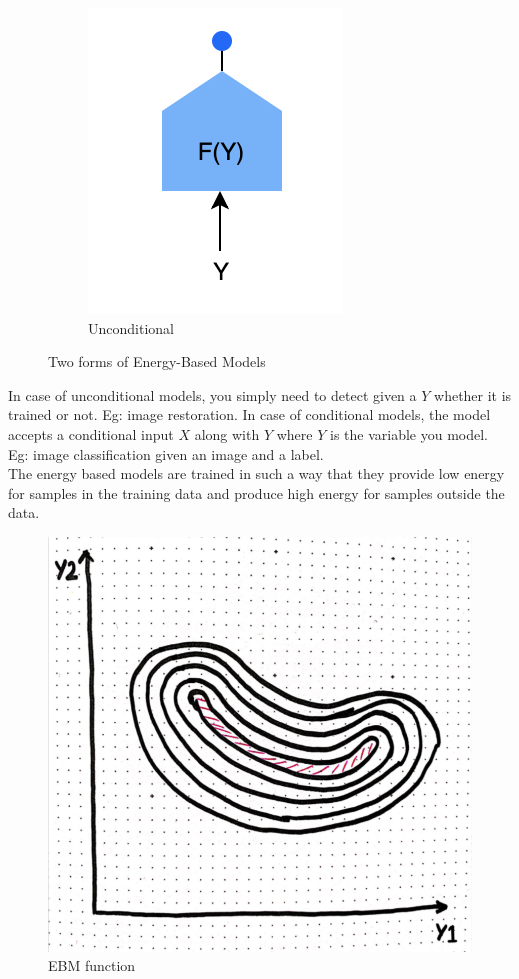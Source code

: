 \begin{figure}[!htb]
\begin{subfigure}[b]{0.25\textwidth}
        \includegraphics[width=\textwidth]{figs/unconditional_EBM.png}	
        \caption{Unconditional}	
        \label{fig:8a_unconditional}	
    \end{subfigure}	
    \caption{Two forms of Energy-Based Models}\label{fig:EBM}	
\end{figure}	

In case of unconditional models, you simply need to detect given a $Y$ whether it is trained or not. Eg: image restoration.
In case of conditional models, the model accepts a conditional input $X$ along with $Y$ where $Y$ is the variable you model. Eg: image classification given an image and a label.\\

The energy based models are trained in such a way that they provide low energy for samples in the training data and produce high energy for samples outside the data.
\begin{figure}[!ht]
    \centering
    \includegraphics[width=0.4\linewidth]{figs/EBM_function.png}
    \caption{EBM function}
    \label{fig:EBM_function}
\end{figure}
